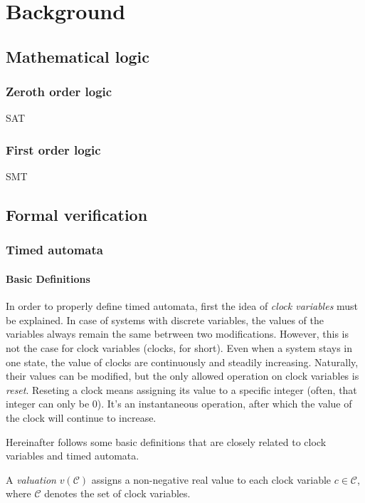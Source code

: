 \chapter{Background}
\label{chap:background}



\section{Mathematical logic}

\subsection{Zeroth order logic}
SAT
\subsection{First order logic}
SMT

\section{Formal verification}
\subsection{Timed automata}

\subsubsection{Basic Definitions}
In order to properly define timed automata, first the idea of \emph{clock variables} must be explained. In case of systems with discrete variables, the values of the variables always remain the same betrween two modifications. However, this is not the case for clock variables (clocks, for short). Even when a system stays in one state, the value of clocks are continuously and steadily increasing. Naturally, their values can be modified, but the only allowed operation on clock variables is \emph{reset}. Reseting a clock means assigning its value to a specific integer (often, that integer can only be 0). It's an instantaneous operation, after which the value of the clock will continue to increase.

Hereinafter follows some basic definitions that are closely related to clock variables and timed automata. 

\begin{definition}
	A \emph{valuation} $v(\mathcal{C})$ assigns a non-negative real value
	to each clock variable $c \in \mathcal{C}$, where $\mathcal{C}$ denotes the set of clock
	variables.
\end{definition}

